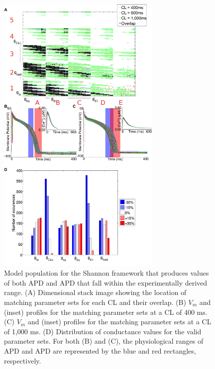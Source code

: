 \documentclass[../thesis-main.tex]{subfiles}
\begin{document}
\begin{figure}
 \centering
 \includegraphics[width=0.7\textwidth]{shannon-population}
 \caption[Model population for the Shannon framework that produces values of both APD and APD that fall within the experimentally derived range.]{Model population for the Shannon framework that produces values of both APD and APD that fall within the experimentally derived range. (A) Dimensional stack image showing the location of matching parameter sets for each CL and their overlap. (B) $V_m$ and \cai{} (inset) profiles for the matching parameter sets at a CL of 400 ms. (C) $V_m$ and \cai{} (inset) profiles for the matching parameter sets at a CL of 1,000 ms. (D) Distribution of conductance values for the valid parameter sets. For both (B) and (C), the physiological ranges of APD and APD are represented by the blue and red rectangles, respectively.}
 \label{fig:shannon-population}
\end{figure}
\end{document}
